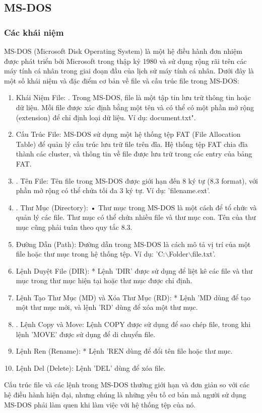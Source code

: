 \documentclass[12pt,a4paper]{article}
\begin{document}
\subsection{MS-DOS}
\subsubsection{Các khái niệm}
MS-DOS (Microsoft Disk Operating System) là một hệ điều hành đơn nhiệm được phát triển bởi Microsoft trong thập kỷ 1980 và sử dụng rộng rãi trên các máy tính cá nhân trong giai đoạn đầu của lịch sử máy tính cá nhân. Dưới đây là một số khái niệm và đặc điểm cơ bản về file và cấu trúc file trong MS-DOS:
\begin{enumerate}
	\item Khái Niệm File:
	. Trong MS-DOS, file là một tập tin lưu trữ thông tin hoặc dữ liệu. Mỗi file được xác định bằng một tên và có thể có một phần mở rộng (extension) để chỉ định loại dữ liệu. Ví dụ: document.txt".
	
	\item Cấu Trúc File:
	MS-DOS sử dụng một hệ thống tệp FAT (File Allocation Table) để quản lý cấu trúc lưu trữ file trên đĩa. Hệ thống tệp FAT chia đĩa thành các cluster, và thông tin về file được lưu trữ trong các entry của bảng FAT.
	
	\item . Tên File:
	Tên file trong MS-DOS được giới hạn đến 8 ký tự (8.3 format), với phần mở rộng có thể chứa tối đa 3 ký tự. Ví dụ: 'filename.ext'.
	
	\item . Thư Mục (Directory):
	• Thư mục trong MS-DOS là một cách để tổ chức và quản lý các file. Thư mục có thể chứa nhiều file và thư mục con. Tên của thư mục cũng phải tuân theo quy tắc 8.3.
	
	\item Đường Dẫn (Path):
	Đường dẫn trong MS-DOS là cách mô tả vị trí của một file hoặc thư mục trong hệ thống tệp. Ví dụ: 'C:$\backslash$Folder$\backslash$file.txt'.
	
	\item Lệnh Duyệt File (DIR):
	* Lệnh 'DIR' được sử dụng để liệt kê các file và thư mục trong thư mục hiện tại hoặc thư mục được chỉ định.
	
	\item Lệnh Tạo Thư Mục (MD) và Xóa Thư Mục (RD):
	* Lệnh 'MD dùng để tạo một thư mục mới, và lệnh 'RD' dùng để xóa một thư mục.
	
	\item . Lệnh Copy và Move:
	Lệnh COPY được sử dụng để sao chép file, trong khi lệnh 'MOVE' được sử dụng để di chuyển file.
	
	\item Lệnh Ren (Rename):
	* Lệnh 'REN dùng để đổi tên file hoặc thư mục.
	
	\item Lệnh Del (Delete):
	Lệnh 'DEL' dùng để xóa file.
	
\end{enumerate}
Cấu trúc file và các lệnh trong MS-DOS thường giới hạn và đơn giản so với các hệ điều hành hiện đại, nhưng chúng là những yếu tố cơ bản mà người sử dụng MS-DOS phải làm quen khi làm việc với hệ thống tệp của nó.
\end{document}
